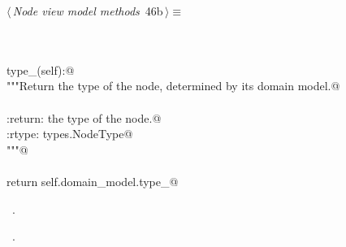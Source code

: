 \documentclass[
    a4paper,      %
    10pt,         %
    openright,    %
    notitlepage,  %
    parskip=half, %
]{scrreprt}       %
\theoremstyle{definition}                    %
\begin{document}
\begin{flushleft} \small
\begin{minipage}{\linewidth}\label{scrap61}\raggedright\small
{} $\langle\,${\itshape Node view model methods}\nobreak\ {\footnotesize {46b}}$\,\rangle\equiv$
\vspace{-1ex}
\begin{list}{}{} \item
\mbox{}\lstinline@@\\
\mbox{}\lstinline@property@\\
\mbox{}\lstinline@def type_(self):@\\
\mbox{}\lstinline@    """Return the type of the node, determined by its domain model.@\\
\mbox{}\lstinline@@\\
\mbox{}\lstinline@    :return: the type of the node.@\\
\mbox{}\lstinline@    :rtype: types.NodeType@\\
\mbox{}\lstinline@    """@\\
\mbox{}\lstinline@@\\
\mbox{}\lstinline@    return self.domain_model.type_@\\
\mbox{}\lstinline@@{\NWsep}
\end{list}
\vspace{-1.5ex}
\footnotesize
\begin{list}{}{\setlength{\itemsep}{-\parsep}\setlength{\itemindent}{-\leftmargin}}
\item \NWtxtMacroDefBy\ .
\item \NWtxtMacroRefIn\ .

\item{}
\end{list}
\end{minipage}\vspace{4ex}
\end{flushleft}
\end{document}
